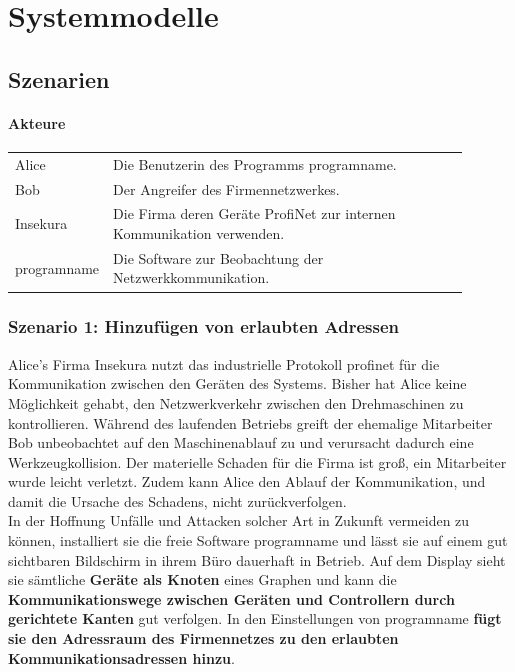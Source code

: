 \chapter{Systemmodelle}



\section{Szenarien}

\subsubsection*{Akteure}

\begin{tabular}{lp{0.9\linewidth}}

Alice & Die Benutzerin des Programms \gls{programname}. \\

Bob & Der Angreifer des Firmennetzwerkes. \\

Insekura & Die Firma deren Geräte ProfiNet zur internen Kommunikation verwenden. \\

\gls{programname} & Die Software zur Beobachtung der Netzwerkkommunikation.\\

\end{tabular}

\subsection{Szenario 1: Hinzufügen von erlaubten Adressen}

Alice's Firma Insekura nutzt das industrielle Protokoll \gls{profinet} für die Kommunikation zwischen den Geräten des Systems. Bisher hat Alice keine Möglichkeit gehabt, den Netzwerkverkehr zwischen den Drehmaschinen zu kontrollieren. Während des laufenden Betriebs greift der ehemalige Mitarbeiter Bob unbeobachtet auf den Maschinenablauf zu und verursacht dadurch eine Werkzeugkollision. Der materielle Schaden für die Firma ist groß, ein Mitarbeiter wurde leicht verletzt. Zudem kann Alice den Ablauf der Kommunikation, und damit die Ursache des Schadens, nicht zurückverfolgen.\\
In der Hoffnung Unfälle und Attacken solcher Art in Zukunft vermeiden zu können, installiert sie die freie Software \gls{programname} und lässt sie auf einem gut sichtbaren Bildschirm in ihrem Büro dauerhaft in Betrieb. Auf dem Display sieht sie sämtliche \textbf{Geräte als Knoten} eines Graphen und kann die \textbf{Kommunikationswege zwischen Geräten und Controllern durch gerichtete Kanten} gut verfolgen. In den Einstellungen von \gls{programname} \textbf{fügt sie den Adressraum des Firmennetzes zu den erlaubten Kommunikationsadressen hinzu}.

